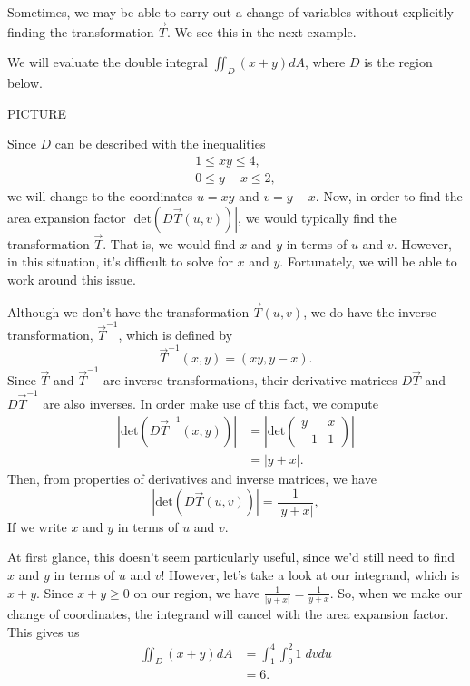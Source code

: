 \documentclass{ximera}
\begin{document}
Sometimes, we may be able to carry out a change of variables without explicitly finding the transformation $\vec{T}$. We see this in the next example.

\begin{example}
We will evaluate the double integral $\iint_D (x+y)dA$, where $D$ is the region below.

PICTURE

Since $D$ can be described with the inequalities
\begin{align*}
1\leq xy\leq 4,\\
0\leq y-x \leq 2,
\end{align*}
we will change to the coordinates $u=xy$ and $v=y-x$. Now, in order to find the area expansion factor $\left|\text{det}(D\vec{T}(u,v))\right|$, we would typically find the transformation $\vec{T}$. That is, we would find $x$ and $y$ in terms of $u$ and $v$. However, in this situation, it's difficult to solve for $x$ and $y$. Fortunately, we will be able to work around this issue.

Although we don't have the transformation $\vec{T}(u,v)$, we do have the inverse transformation, $\vec{T}^{-1}$, which is defined by
\[
\vec{T}^{-1}(x,y) = (xy, y-x).
\]
Since $\vec{T}$ and $\vec{T}^{-1}$ are inverse transformations, their derivative matrices $D\vec{T}$ and $D\vec{T}^{-1}$ are also inverses. In order make use of this fact, we compute
\begin{align*}
\left|\text{det}(D\vec{T}^{-1}(x,y))\right| &= \left|\text{det}\begin{pmatrix}y & x\\
-1 & 1\end{pmatrix}\right|\\
&= \left|y+x\right|.
\end{align*}
Then, from properties of derivatives and inverse matrices, we have
\[
\left|\text{det}(D\vec{T}(u,v))\right| = \frac{1}{\left|y+x\right|},
\]
If we write $x$ and $y$ in terms of $u$ and $v$.

At first glance, this doesn't seem particularly useful, since we'd still need to find $x$ and $y$ in terms of $u$ and $v$! However, let's take a look at our integrand, which is $x+y$. Since $x+y\geq 0$ on our region, we have $\frac{1}{\left|y+x\right|} = \frac{1}{y+x}$. So, when we make our change of coordinates, the integrand will cancel with the area expansion factor. This gives us
\begin{align*}
\iint_D (x+y)dA &= \int_1^4\int_0^2 1\;dvdu\\
&= 6.
\end{align*}
\end{example}
\end{document}

